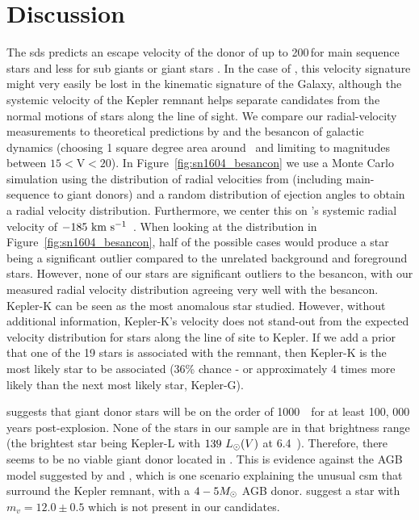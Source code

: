 \documentclass[preprint2]{aastex}
\begin{document}
\section{Discussion}
\label{sec:discussion}

The \gls{sds} predicts an escape velocity of the donor of up to 200\,\kms for main sequence stars and less for sub giants or giant stars \citep[down to roughly 60~\,\kms;][]{2008ApJ...677L.109H}. In the case of , this velocity signature might very easily be lost in the kinematic signature of the Galaxy, although the systemic velocity of the Kepler remnant helps separate candidates from the normal motions of stars along the line of sight. We compare our radial-velocity measurements to theoretical predictions by \citet{2008ApJ...677L.109H} and the \gls{besancon} of galactic dynamics (choosing 1 square degree area around \ and limiting to magnitudes between $15<$V$<20$). In Figure~\ref{fig:sn1604_besancon} we use a Monte Carlo simulation using the distribution of radial velocities from \citet{2008ApJ...677L.109H} (including main-sequence to giant donors) and a random distribution of ejection angles to obtain a radial velocity distribution. Furthermore, we center this on 's systemic radial velocity of $-185~\textrm{km}~\textrm{s}^{-1}$\ \citep{2003A&A...407..249S}. When looking at the \citet{2008ApJ...677L.109H} distribution in Figure~\ref{fig:sn1604_besancon}, half of the possible cases would produce a star being a significant outlier compared to the unrelated background and foreground stars. However, none of our stars are significant outliers to the \gls{besancon}, with our measured radial velocity distribution agreeing very well with the \gls{besancon}. Kepler-K can be seen as the most anomalous star studied. However, without additional information, Kepler-K's velocity does not stand-out from the expected velocity distribution for stars along the line of site to Kepler. If we add a prior that one of the 19 stars is associated with the remnant, then Kepler-K is the most likely star to be associated (36\% chance - or approximately 4 times more likely than the next most likely star, Kepler-G).

\citet{2000ApJS..128..615M} suggests that giant donor stars will be on the order of 1000~\lsun\  for at least 100, 000 years post-explosion. None of the stars in our sample are in that brightness range (the brightest star being Kepler-L with $139~\hbox{$L_{\odot}$}(V)$ at 6.4~\kpc). Therefore, there seems to be no viable giant donor located in . This is evidence against the AGB model suggested by \citet{2012A&A...537A.139C} and \citet{2013ApJ...764...63B}, which is one scenario explaining the unusual \gls{csm} that surround the Kepler remnant, with a $4 - 5 \hbox{$M_{\odot}$}$ AGB donor. \citet{2012A&A...537A.139C} suggest a star with $m_v=12.0 \pm 0.5$ which is not present in our candidates. 
\end{document}
